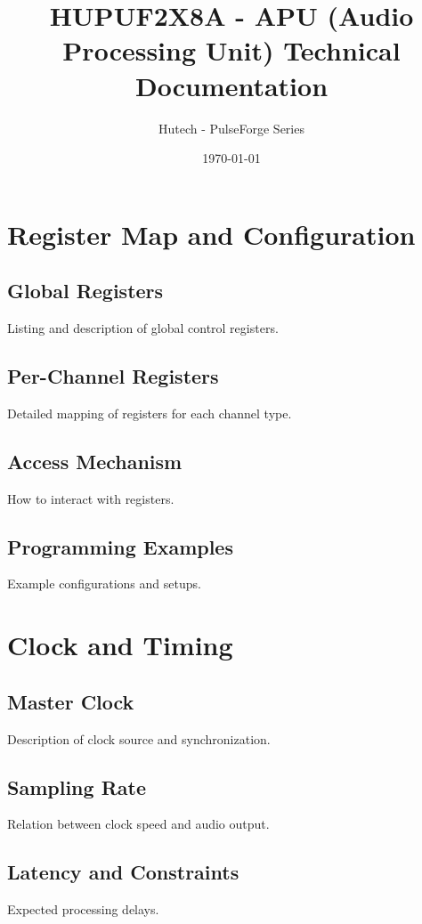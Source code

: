 \documentclass[a4paper,12pt]{article}
\title{HUPUF2X8A - APU (Audio Processing Unit) Technical Documentation}
\author{Hutech - PulseForge Series}
\date{\today}
\begin{document}

\newpage

\tableofcontents
\newpage


\newpage


\newpage


\newpage

\section{Register Map and Configuration}
\subsection{Global Registers}
Listing and description of global control registers.
\subsection{Per-Channel Registers}
Detailed mapping of registers for each channel type.
\subsection{Access Mechanism}
How to interact with registers.
\subsection{Programming Examples}
Example configurations and setups.

\section{Clock and Timing}
\subsection{Master Clock}
Description of clock source and synchronization.
\subsection{Sampling Rate}
Relation between clock speed and audio output.
\subsection{Latency and Constraints}
Expected processing delays.
\end{document}
